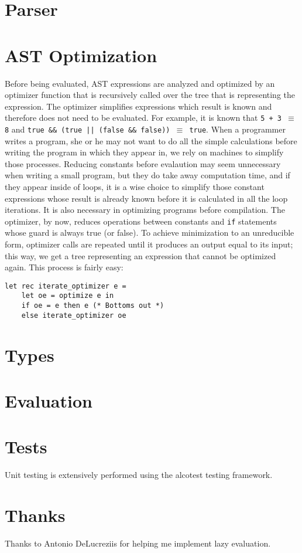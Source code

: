 \documentclass[12pt]{article}
\begin{document}
\section{Parser}

\section{AST Optimization}
Before being evaluated, AST expressions are analyzed and optimized by an
optimizer function that is recursively called over the tree that is representing
the expression. The optimizer simplifies expressions which result is known and
therefore does not need to be evaluated. For example, it is known that \texttt{5
+ 3 $\equiv$ 8} and \texttt{true \&\& (true || (false \&\& false)) $\equiv$
true}. When a programmer writes a program, she or he may not want to do all the
simple calculations before writing the program in which they appear in, we rely
on machines to simplify those processes. Reducing constants before evalaution
may seem unnecessary when writing a small program, but they do take away
computation time, and if they appear inside of loops, it is a wise choice to
simplify those constant expressions whose result is already known before it is
calculated in all the loop iterations. It is also necessary in optimizing
programs before compilation. The optimizer, by now, reduces operations between
constants and \texttt{if} statements whose guard is always true (or false). To
achieve minimization to an unreducible form, optimizer calls are repeated until
it produces an output equal to its input; this way, we get a tree representing
an expression that cannot be optimized again. This process is fairly easy:

\begin{lstlisting}[style=caml]
let rec iterate_optimizer e =
	let oe = optimize e in
	if oe = e then e (* Bottoms out *)
	else iterate_optimizer oe
\end{lstlisting}

\section{Types}

\section{Evaluation}

\section{Tests}
Unit testing is extensively performed using the alcotest testing framework.

\section{Thanks}
Thanks to Antonio DeLucreziis for helping me implement lazy evaluation.
\end{document}
